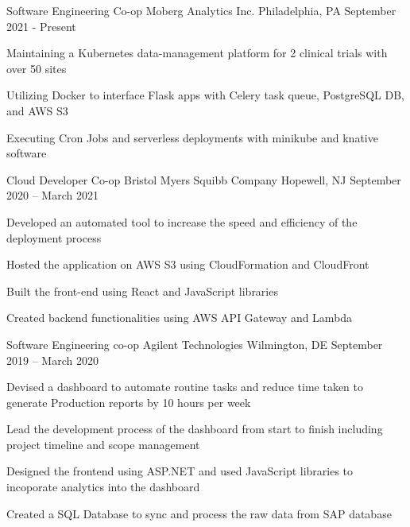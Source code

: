 

\begin{cventries}

  
	\cventry
	{Software Engineering Co-op}
	{Moberg Analytics Inc.}
	{Philadelphia, PA}
	{September 2021 - Present}
	{\begin{cvitems}
		\item {Maintaining a Kubernetes data-management platform for 2 clinical trials with over 50 sites}
		\item {Utilizing Docker to interface Flask apps with Celery task queue, PostgreSQL DB, and AWS S3}
		\item {Executing Cron Jobs and serverless deployments with minikube and knative software}
		\end{cvitems}}
	
	\vspace{-2mm}
	\cventry
	{Cloud Developer Co-op}
	{Bristol Myers Squibb Company}
	{Hopewell, NJ}
	{September 2020 – March 2021}
	{\begin{cvitems}
		\item {Developed an automated tool to increase the speed and efficiency of the deployment process}
        \item {Hosted the application on AWS S3 using CloudFormation and CloudFront}
        \item {Built the front-end using React and JavaScript libraries}
        \item {Created backend functionalities using AWS API Gateway and Lambda}
		\end{cvitems}}
	
	\vspace{-2mm}
	\cventry
	{Software Engineering co-op}
	{Agilent Technologies}
	{Wilmington, DE}
	{September 2019 – March 2020}
	{\begin{cvitems}
	    \item {Devised a dashboard to automate routine tasks and reduce time taken to generate Production reports by 10 hours per week}
        \item {Lead the development process of the dashboard from start to finish including project timeline and scope management}
        \item {Designed the frontend using ASP.NET and used JavaScript libraries to incoporate analytics into the dashboard}
        \item {Created a SQL Database to sync and process the raw data from SAP database}
		\end{cvitems}}
	

\end{cventries}
